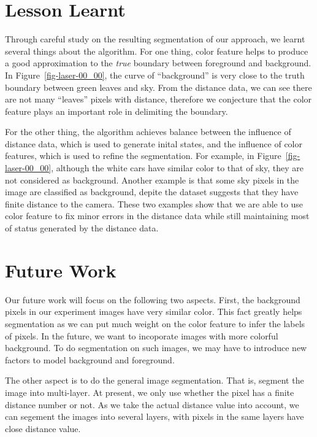 \documentclass{article} %
\begin{document}


\section{Lesson Learnt}
 Through careful study on the resulting segmentation of our approach,
 we learnt several things about the algorithm.
 For one thing, color feature helps to produce a good approximation to the
 \emph{true} boundary between foreground and background. 
 In Figure~\ref{fig-laser-00_00}, the curve of ``background'' is very close to
 the truth boundary between green leaves and sky. From the distance
 data, we can see there are not many ``leaves'' pixels with
 distance, therefore we conjecture that the color feature plays an
 important role in delimiting the boundary.

 For the other thing, the algorithm achieves balance between the
 influence of distance data, which is used to generate inital states,
 and the influence of color features, which is used to refine the
 segmentation. 
 For example, in Figure~\ref{fig-laser-00_00}, although the white cars have similar color
 to that of sky, they are not considered as background.  
 Another example is that some sky pixels in the image are classified
 as background, depite the dataset suggests that they have finite
 distance to the camera.  
 These two examples show that we are able to use color feature to fix
 minor errors in the distance data while still maintaining most of
 status generated by the distance data.

\section {Future Work}
Our future work will focus on the following two aspects.
First, the background pixels in our experiment images have very
similar color. This fact greatly helps segmentation as we can put much
weight on the color feature to infer the labels of pixels. In the
future, we want to incoporate images with more colorful
background. To do segmentation on such images, we may have to
introduce new factors to model background and foreground.

The other aspect is to do the general image segmentation. That is,
segment the image into multi-layer. At present, we only use whether
the pixel has a finite distance number or not. As we take the actual
distance value into account, we can segement the images into several
layers, with pixels in the same layers have close distance value.
\end{document}
